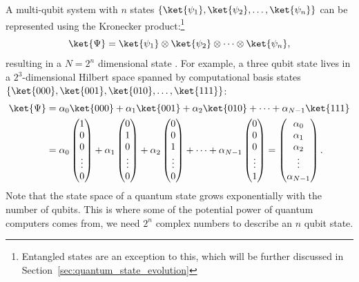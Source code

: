 \documentclass[a4paper,10pt]{article}
\begin{document}
A multi-qubit system with $n$ states $\{\ket{\psi_1}, \ket{\psi_2}, \ldots, \ket{\psi_n}\}$ can be represented using the Kronecker product:\footnote{Entangled states are an exception to this, which will be further discussed in Section~\ref{sec:quantum_state_evolution}}
\begin{equation}
\ket{\Psi} = \ket{\psi_1} \otimes \ket{\psi_2} \otimes \dotsm \otimes \ket{\psi_n},
\end{equation}
resulting in a $N = 2^n$ dimensional state \ket{\Psi}.
For example, a three qubit state lives in a  $2^3$-dimensional Hilbert space spanned by computational basis states $\{\ket{000}, \ket{001}, \ket{010}, \ldots, \ket{111}\}$:
\begin{equation}
\begin{aligned}
\ket{\Psi} &= \alpha_0\ket{000} + \alpha_1\ket{001} + \alpha_2\ket{010} + \dotsm + \alpha_{N-1}\ket{111} \\
&= \alpha_0\begin{pmatrix}1 \\ 0 \\ 0 \\ \vdots \\ 0\end{pmatrix} + \alpha_1\begin{pmatrix}0 \\ 1 \\ 0 \\ \vdots \\ 0\end{pmatrix} + \alpha_2\begin{pmatrix}0 \\ 0 \\ 1 \\ \vdots \\ 0\end{pmatrix} + \dotsm + \alpha_{N-1}\begin{pmatrix}0 \\ 0 \\ 0 \\ \vdots \\ 1\end{pmatrix} = \begin{pmatrix}\alpha_0 \\ \alpha_1 \\ \alpha_2 \\ \vdots \\ \alpha_{N-1}\end{pmatrix}.
\end{aligned}
\end{equation}
Note that the state space of a quantum state grows exponentially with the number of qubits.
This is where some of the potential power of quantum computers comes from, we need $2^n$ complex numbers to describe an $n$ qubit state.
\end{document}
